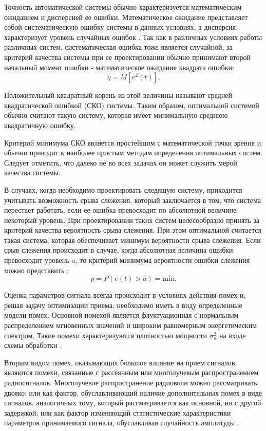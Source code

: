 Точность автоматической системы обычно характеризуется математическим ожиданием и дисперсией ее ошибки.
Математическое ожидание представляет собой систематическую ошибку системы в данных условиях, а дисперсия
характеризует уровень случайных ошибок \cite{pugachev}. Так как в различных условиях работы
различных систем, систематическая ошибка тоже является случайной, за критерий качества
системы при ее проектировании обычно принимают второй начальный момент ошибки - математическое ожидание
квадрата ошибки:
\begin{equation}
	\label{eq:stat_err_prob}
	\eta = M[e^2(t)].
\end{equation}

Положительный квадратный корень из этой величины называют средней квадратической ошибкой  (СКО) системы. Таким образом,
оптимальной системой обычно считают такую систему, которая имеет минимальную среднюю квадратичную ошибку.

Критерий минимума СКО является простейшим с математической точки зрения и обычно приводит
к наиболее простым методам определения оптимальных систем. Следует отметить, что далеко не во всех задачах он может служить мерой
качества системы. 

В случаях, когда необходимо проектировать следящую систему, приходится учитывать возможность срыва слежения,
который заключается в том, что система перестает работать, если ее ошибка превосходит по абсолютной величине некоторый
уровень. При проектировании таких систем целесообразно принять за критерий качества вероятность срыва слежения. При
этом оптимальной считается такая система, которая обеспечивает минимум вероятности срыва слежения. Если срыв слежения
происходит в случае, когда абсолютная величина ошибки превосходит уровень $a$, то критерий минимума вероятности ошибки
слежения можно представить \cite{pugachev}:
\begin{equation}
	\label{eq:prob_lost_signal}
	p = P(e(t) > a) = \mbox{min}.
\end{equation}

Оценка параметров сигнала всегда происходит в условиях действия помех и, решая задачу оптимизации приема,
необходимо иметь в виду определенные модели помех. Основной помехой является флуктуационная с нормальным
распределением мгновенных значений и широким равномерным энергетическим спектром. Такие помехи характеризуются
плотностью мощности ${\sigma_n^2}$ на входе схемы обработки \cite{pestryakov-book}.

Вторым видом помех, оказывающих
большое влияние на прием сигналов, являются помехи, связанные с рассеянным или многолучевым распространением
радиосигналов. Многолучевое распространение радиоволн можно рассматривать двояко: или как фактор, обуславливающий
наличие дополнительных помех в виде сигналов, аналогичных тому, который рассматривается как основной, но с другой
задержкой; или как фактор изменяющий статистические характеристики параметров принимаемого сигнала,
обуславливая случайность амплитуды \cite{pestryakov-book}.

